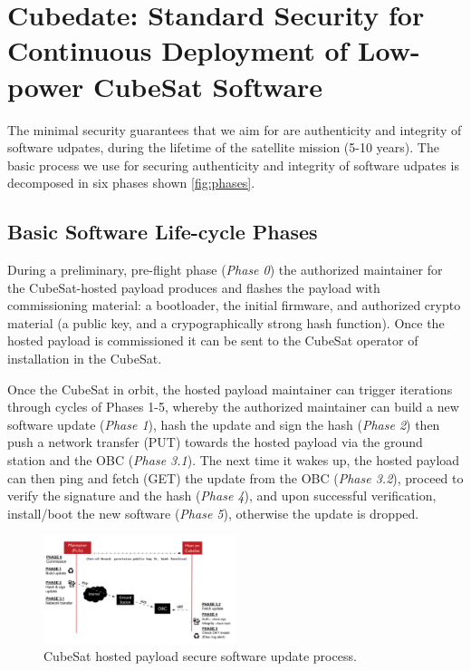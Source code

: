\section{Cubedate: Standard Security for Continuous Deployment of Low-power CubeSat Software}
\label{sec:low-power-orbital-communication-arch}


The minimal security guarantees that we aim for are authenticity and integrity of software udpates, during the lifetime of the satellite mission (5-10 years).
The basic process we use for securing authenticity and integrity of software udpates is decomposed in six phases shown \autoref{fig:phases}. 

\subsection{Basic Software Life-cycle Phases}

During a preliminary, pre-flight phase (\textit{Phase 0}) the authorized maintainer for the CubeSat-hosted payload
produces and flashes the payload with commissioning material:
a bootloader, the initial firmware, and authorized crypto material (a public key, and a crypographically strong hash function).
Once the hosted payload is commissioned it can be sent to the CubeSat operator of installation in the CubeSat.


Once the CubeSat in orbit, the hosted payload maintainer can trigger iterations through cycles of Phases 1-5, whereby
the authorized maintainer can build a new software update (\textit{Phase 1}), hash the update
and sign the hash (\textit{Phase 2}) then push a network transfer (PUT) towards the hosted payload via the ground station and the OBC (\textit{Phase 3.1}). The next time it wakes up, the hosted payload can
then ping and fetch (GET) the update from the OBC (\textit{Phase 3.2}), proceed to verify the signature and the hash (\textit{Phase 4}),
and upon successful verification, install/boot the new software (\textit{Phase 5}), otherwise the update is dropped.

\begin{figure}[t]
    \centering
    \includegraphics[width=0.5\textwidth]{Figures/CubeSat-Payload-update.png}
    \caption{CubeSat hosted payload secure software update process.}
    \label{fig:phases}
\end{figure}

